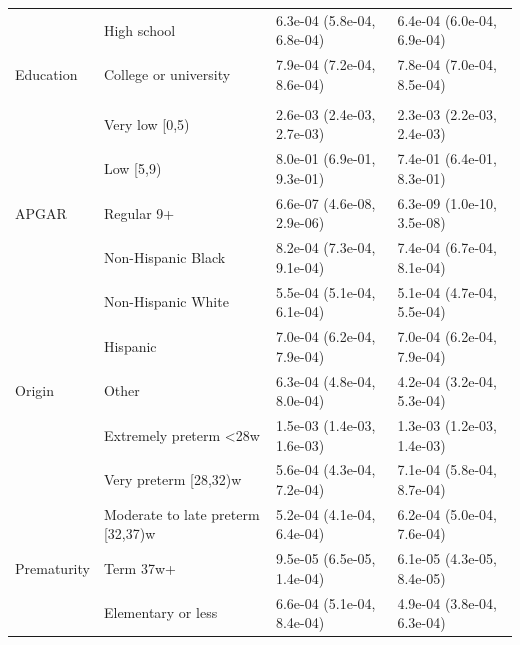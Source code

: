 \documentclass[10pt, twoside, parskip=half]{article}
\begin{document}
\begin{table}[t]
\begin{tabular}{llll}
 & High school & 6.3e-04 (5.8e-04, 6.8e-04) & 6.4e-04 (6.0e-04, 6.9e-04)\\

\multirow{-3}{*}{\raggedright\arraybackslash \hspace{1em}Education} & College or university & 7.9e-04 (7.2e-04, 8.6e-04) & 7.8e-04 (7.0e-04, 8.5e-04)\\
\cmidrule{1-4}
\addlinespace[0.3em]
\multicolumn{4}{l}{\textbf{2000-2005}}\\
 & Very low [0,5) & 2.6e-03 (2.4e-03, 2.7e-03) & 2.3e-03 (2.2e-03, 2.4e-03)\\

 & Low [5,9) & 8.0e-01 (6.9e-01, 9.3e-01) & 7.4e-01 (6.4e-01, 8.3e-01)\\

\multirow{-3}{*}{\raggedright\arraybackslash \hspace{1em}APGAR} & Regular 9+ & 6.6e-07 (4.6e-08, 2.9e-06) & 6.3e-09 (1.0e-10, 3.5e-08)\\
\cmidrule{1-4}
 & Non-Hispanic Black & 8.2e-04 (7.3e-04, 9.1e-04) & 7.4e-04 (6.7e-04, 8.1e-04)\\

 & Non-Hispanic White & 5.5e-04 (5.1e-04, 6.1e-04) & 5.1e-04 (4.7e-04, 5.5e-04)\\

 & Hispanic & 7.0e-04 (6.2e-04, 7.9e-04) & 7.0e-04 (6.2e-04, 7.9e-04)\\

\multirow{-4}{*}{\raggedright\arraybackslash \hspace{1em}Origin} & Other & 6.3e-04 (4.8e-04, 8.0e-04) & 4.2e-04 (3.2e-04, 5.3e-04)\\
\cmidrule{1-4}
 & Extremely preterm <28w & 1.5e-03 (1.4e-03, 1.6e-03) & 1.3e-03 (1.2e-03, 1.4e-03)\\

 & Very preterm [28,32)w & 5.6e-04 (4.3e-04, 7.2e-04) & 7.1e-04 (5.8e-04, 8.7e-04)\\

 & Moderate to late preterm [32,37)w & 5.2e-04 (4.1e-04, 6.4e-04) & 6.2e-04 (5.0e-04, 7.6e-04)\\

\multirow{-4}{*}{\raggedright\arraybackslash \hspace{1em}Prematurity} & Term 37w+ & 9.5e-05 (6.5e-05, 1.4e-04) & 6.1e-05 (4.3e-05, 8.4e-05)\\
\cmidrule{1-4}
 & Elementary or less & 6.6e-04 (5.1e-04, 8.4e-04) & 4.9e-04 (3.8e-04, 6.3e-04)\\


\end{tabular}
\end{table}
\end{document}
